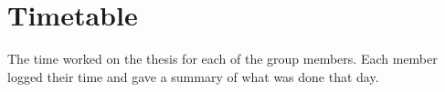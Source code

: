 \chapter{Timetable}

The time worked on the thesis for each of the group members. Each member logged their time and gave a summary of what was done that day.
